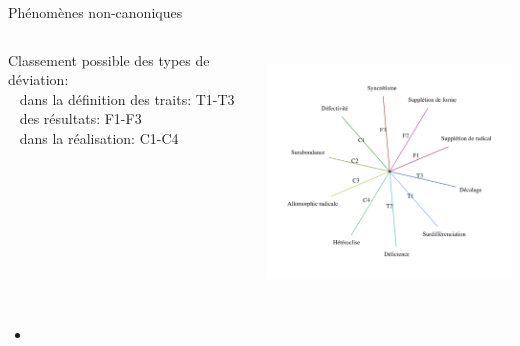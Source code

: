 \begin{frame}[t]{Phénomènes non-canoniques}
\begin{columns}[t]
\begin{column}[T]{5cm}
\begin{wideitemize}
\begin{smallwideitemize}
\item[\highlightii{+}] Classement possible des types de déviation:\\%
\ra~ dans la définition des traits: T1-T3\\
\ra~ des résultats: F1-F3\\
\ra~ dans la réalisation: C1-C4\\
\cite{walther13phd}
\end{smallwideitemize}



\end{wideitemize}

     \end{column}
     \begin{column}[T]{7cm} %
          \includegraphics[height=6.4cm]{canonicityParsli}
     \end{column}
     \end{columns}

\pause
\begin{itemize}
\item[\highlighti{\danger}]\footnotesize {}
\end{itemize}
\end{frame}